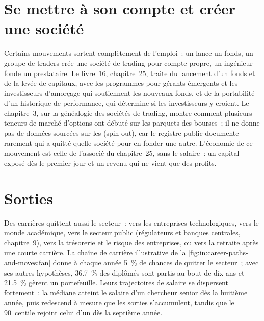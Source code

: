 \section{Se mettre à son compte et créer une société}

Certains mouvements sortent complètement de l'emploi~: un  lance un fonds, un groupe de traders crée une société de trading pour compte propre, un ingénieur fonde un prestataire.
Le livre~16, chapitre~25, traite du lancement d'un fonds et de la levée de capitaux, avec les programmes pour gérants émergents et les investisseurs d'amorçage
qui soutiennent les nouveaux fonds, et de la portabilité d'un historique de performance, qui détermine si les investisseurs y croient.
Le chapitre~3, sur la généalogie des sociétés de trading, montre comment plusieurs teneurs de marché d'options ont débuté sur les parquets des bourses~;
il ne donne pas de données sourcées sur les  (spin-out), car le registre public documente rarement qui a quitté quelle société pour en fonder une autre.
L'économie de ce mouvement est celle de l'associé du chapitre~25, sans le salaire~: un capital exposé dès le premier jour
et un revenu qui ne vient que des profits.

\section{Sorties}

Des carrières quittent aussi le secteur~: vers les entreprises technologiques, vers le monde académique, vers le secteur public
(régulateurs et banques centrales, chapitre~9), vers la trésorerie et le risque des entreprises, ou vers la retraite après une courte carrière.
La chaîne de carrière illustrative de la \cref{fig:in:career-paths-and-moves:fan} donne à chaque année 5~\% de chances de quitter le secteur~; avec ses autres hypothèses, 36.7~\%
des diplômés sont partis au bout de dix ans et 21.5~\% gèrent un portefeuille. Leurs trajectoires de salaire se dispersent fortement~: la médiane atteint le salaire d'un chercheur senior
dès la huitième année, puis redescend à mesure que les sorties s'accumulent, tandis que le 90~centile rejoint celui
d'un  dès la septième année.

